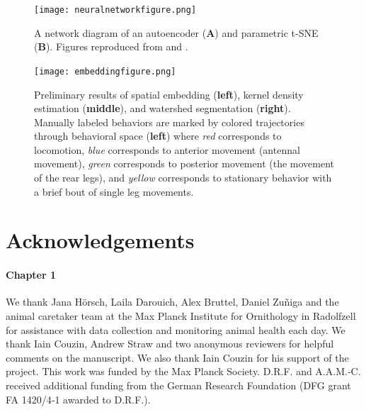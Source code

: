 \documentclass[11pt,a4paper,oneside]{article}
\begin{document}
\begin{appendices}
\begin{figure}
	\begin{center}
		\texttt{[image: neuralnetworkfigure.png]}\\
	\end{center}
	\begin{flushleft}
		\caption{A network diagram of an autoencoder (\textbf{A}) and parametric t-SNE (\textbf{B}). Figures reproduced from \citet{hinton2006autoencoder} and \citet{vandermaaten2009ptsne}.\label{fig:network}} 
	\end{flushleft}
\end{figure} 

\begin{figure}
	\begin{center}
		\texttt{[image: embeddingfigure.png]}\\
	\end{center}
	\begin{flushleft}
		\caption{Preliminary results of spatial embedding (\textbf{left}), kernel density estimation (\textbf{middle}), and watershed segmentation (\textbf{right}). Manually labeled behaviors are marked by colored trajectories through behavioral space (\textbf{left}) where \textit{red} corresponds to locomotion, \textit{blue} corresponds to anterior movement (antennal movement), \textit{green} corresponds to posterior movement (the movement of the rear legs), and \textit{yellow} corresponds to stationary behavior with a brief bout of single leg movements.  \label{fig:embedding}} 
	\end{flushleft}
\end{figure} 


\end{appendices}

\pagebreak



\section{Acknowledgements}

\paragraph{Chapter 1}
We thank Jana Hörsch, Laila Darouich, Alex Bruttel, Daniel Zuñiga and the animal caretaker team at the Max Planck Institute for Ornithology in Radolfzell for assistance with data collection and monitoring animal health each day. We thank Iain Couzin, Andrew Straw and two anonymous reviewers for helpful comments on the manuscript. We also thank Iain Couzin for his support of the project. This work was funded by the Max Planck Society. D.R.F. and A.A.M.‐C. received additional funding from the German Research Foundation (DFG grant FA 1420/4‐1 awarded to D.R.F.).
\end{document}
